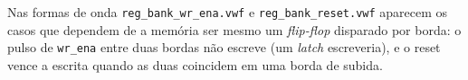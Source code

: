 Nas formas de onda \texttt{reg\_bank\_wr\_ena.vwf} e \texttt{reg\_bank\_reset.vwf} aparecem os casos que dependem de a memória ser mesmo um \textit{flip-flop} disparado por borda: o pulso de \texttt{wr\_ena} entre duas bordas não escreve (um \textit{latch} escreveria), e o reset vence a escrita quando as duas coincidem em uma borda de subida.
